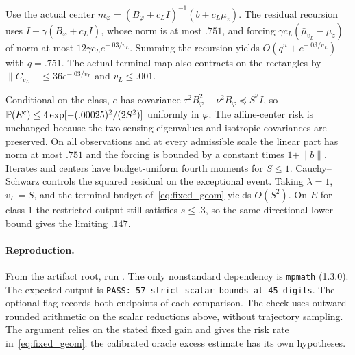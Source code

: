 Use the actual center
$m_\varphi=(B_\varphi+c_LI)^{-1}(b+c_L\mu_z)$.
The residual recursion uses $I-\gamma(B_\varphi+c_LI)$, whose
norm is at most $.751$, and forcing
$\gamma c_L(\bar\mu_{v_L}-\mu_z)$ of norm at most
$12\gamma c_Le^{-.03/v_L}$. Summing the recursion yields
$O(q^n+e^{-.03/v_L})$ with $q=.751$.
The actual terminal map also contracts on the rectangles by
$\|C_{v_L}\|\le36e^{-.03/v_L}$ and $v_L\le.001$.

Conditional on the class, $e$ has covariance
$\tau^2B_\varphi^2+\nu^2B_\varphi\preceq S^2I$,
so $\mathbb P(E^c)\le4\exp[-(.00025)^2/(2S^2)]$ uniformly in $\varphi$.
The affine-center risk is unchanged because the two sensing
eigenvalues and isotropic covariances are preserved.
On all observations and at every admissible scale the linear
part has norm at most $.751$ and the forcing is bounded by
a constant times $1+\|b\|$. Iterates and centers have
budget-uniform fourth moments for $S\le1$.
Cauchy--Schwarz controls the squared residual on the
exceptional event. Taking $\lambda=1$, $v_L=S$, and the
terminal budget of~\eqref{eq:fixed_geom} yields $O(S^2)$.
On $E$ for class 1 the restricted output still satisfies $s\le.3$,
so the same directional lower bound gives the limiting $.147$.

\paragraph{Reproduction.}
From the artifact root, run
.
The only nonstandard dependency is \texttt{mpmath} (1.3.0).
The expected output is \texttt{PASS: 57 strict scalar bounds at
45 digits}. The optional flag  records
both endpoints of each comparison. The check uses outward-rounded
arithmetic on the scalar reductions above, without trajectory
sampling. The argument relies on the stated fixed gain and
gives the risk rate in~\eqref{eq:fixed_geom}; the calibrated
oracle excess estimate has its own hypotheses.
